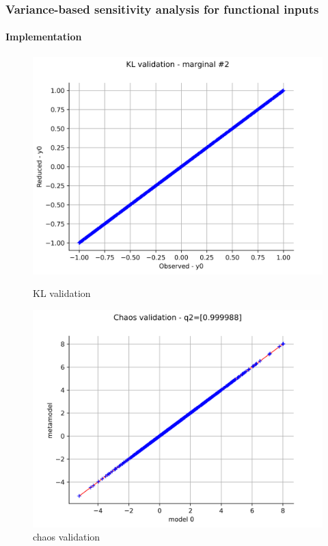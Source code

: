 \documentclass[aspectratio=169]{beamer}
\begin{document}
\begin{frame}[containsverbatim]
\frametitle{Variance-based sensitivity analysis for functional inputs}

\framesubtitle{Implementation}

\begin{figure}[!htb]
  \includegraphics[width=\linewidth]{figures/valid_kl2.png}
  \caption{KL validation}
\endminipage\hfill
{}
  \includegraphics[width=\linewidth]{figures/valid_chaos.png}
  \caption{chaos validation}
\endminipage\hfill
\end{figure}


\end{frame}
\end{document}
